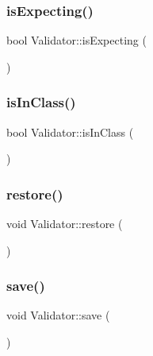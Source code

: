 \subsubsection{\texorpdfstring{is\+Expecting()}{isExpecting()}}
{\footnotesize\ttfamily bool Validator\+::is\+Expecting (\begin{DoxyParamCaption}{ }\end{DoxyParamCaption})}

\mbox{\label{classValidator_a497b47a6718ba3b84a73bc9ee4fd9796}} 
\subsubsection{\texorpdfstring{is\+In\+Class()}{isInClass()}}
{\footnotesize\ttfamily bool Validator\+::is\+In\+Class (\begin{DoxyParamCaption}{ }\end{DoxyParamCaption})}

\mbox{\label{classValidator_a0c89c0c840be87b9011cb518d7bc12ff}} 
\subsubsection{\texorpdfstring{restore()}{restore()}}
{\footnotesize\ttfamily void Validator\+::restore (\begin{DoxyParamCaption}{ }\end{DoxyParamCaption})}

\mbox{\label{classValidator_a055e6bdb84438449655135b9166bcf2d}} 
\subsubsection{\texorpdfstring{save()}{save()}}
{\footnotesize\ttfamily void Validator\+::save (\begin{DoxyParamCaption}{ }\end{DoxyParamCaption})}

\mbox{\label{classValidator_aa0bc30458ce0255fcec64d8346e384a5}} 
